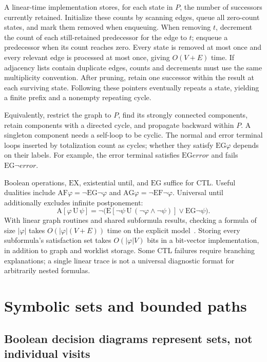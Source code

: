 A linear-time implementation stores, for each state in $P$, the number of successors currently retained.
Initialize these counts by scanning edges, queue all zero-count states, and mark them removed when enqueuing.
When removing $t$, decrement the count of each still-retained predecessor for the edge to $t$; enqueue a predecessor when its count reaches zero.
Every state is removed at most once and every relevant edge is processed at most once, giving $O(V+E)$ time.
If adjacency lists contain duplicate edges, counts and decrements must use the same multiplicity convention.
After pruning, retain one successor within the result at each surviving state.
Following these pointers eventually repeats a state, yielding a finite prefix and a nonempty repeating cycle.

Equivalently, restrict the graph to $P$, find its strongly connected components, retain components with a directed cycle, and propagate backward within $P$.
A singleton component needs a self-loop to be cyclic.
The normal and error terminal loops inserted by totalization count as cycles; whether they satisfy $\mathrm{EG}\varphi$ depends on their labels.
For example, the error terminal satisfies $\mathrm{EG}\mathit{error}$ and fails $\mathrm{EG}\neg\mathit{error}$.

Boolean operations, $\mathrm{EX}$, existential until, and $\mathrm{EG}$ suffice for CTL.
Useful dualities include $\mathrm{AF}\varphi=\neg\mathrm{EG}\neg\varphi$ and $\mathrm{AG}\varphi=\neg\mathrm{EF}\neg\varphi$.
Universal until additionally excludes infinite postponement:
\[
 \mathrm{A}[\varphi\,\mathrm{U}\,\psi]
 =\neg\bigl(\mathrm{E}[\neg\psi\,\mathrm{U}\,(\neg\varphi\land\neg\psi)]
       \lor\mathrm{EG}\neg\psi\bigr).
\]
With linear graph routines and shared subformula results, checking a formula of size $|\varphi|$ takes $O(|\varphi|(V+E))$ time on the explicit model~\cite{baier-2008-model-checking}.
Storing every subformula's satisfaction set takes $O(|\varphi|V)$ bits in a bit-vector implementation, in addition to graph and worklist storage.
Some CTL failures require branching explanations; a single linear trace is not a universal diagnostic format for arbitrarily nested formulas.

\section{Symbolic sets and bounded paths}
\label{sec:ch46-symbolic}

\subsection{Boolean decision diagrams represent sets, not individual visits}
\label{sec:ch46-bdd}

